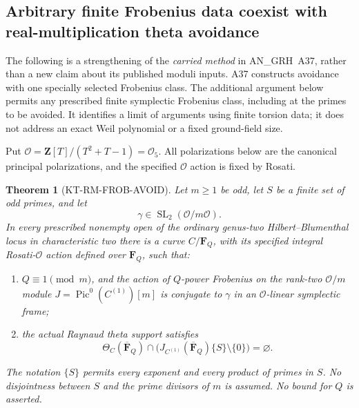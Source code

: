 \documentclass[11pt,a4paper]{article}
\newtheorem{theorem}{Theorem}[section]
\theoremstyle{definition}
\begin{document}


\subsection{Arbitrary finite Frobenius data coexist with real-multiplication theta avoidance}
\label{sec:kt-rm-frobenius-avoidance}

The following is a strengthening of the \emph{carried method} in
AN\_GRH~A37, rather than a new claim about its published moduli
inputs.  A37 constructs avoidance with one specially selected
Frobenius class.  The additional argument below permits any
prescribed finite symplectic Frobenius class, including at the
primes to be avoided.  It identifies a limit of arguments using
finite torsion data; it does not address an exact Weil polynomial
or a fixed ground-field size.

Put $\mathcal O=\mathbf Z[T]/(T^2+T-1)=\mathcal O_5$.
All polarizations below are the canonical principal polarizations,
and the specified $\mathcal O$ action is fixed by Rosati.

\begin{theorem}[KT-RM-FROB-AVOID]
Let $m\geq1$ be odd, let $S$ be a finite set of odd primes, and
let
\[
                    \gamma\in\operatorname{SL}_2(\mathcal O/m\mathcal O).
                                                               \tag{RF.1}
\]
In every prescribed nonempty open of the ordinary genus-two
Hilbert--Blumenthal locus in characteristic two there is a curve
$C/\mathbf F_Q$,
with its specified integral Rosati-$\mathcal O$ action defined
over $\mathbf F_Q$, such that:
\begin{enumerate}
\item $Q\equiv1\pmod m$, and the action of $Q$-power Frobenius
      on the rank-two $\mathcal O/m$ module
      $J=\operatorname{Pic}^0(C^{(1)})[m]$ is conjugate to $\gamma$
      in an $\mathcal O$-linear symplectic frame;
\item the actual Raynaud theta support satisfies
\[
 \Theta_C(\overline{\mathbf F}_Q)\cap
 \bigl(J_{C^{(1)}}(\overline{\mathbf F}_Q)\{S\}\setminus\{0\}\bigr)
                          =\varnothing.                       \tag{RF.2}
\]
\end{enumerate}
The notation $\{S\}$ permits every exponent and every product
of primes in $S$.  No disjointness between $S$ and the prime
divisors of $m$ is assumed.  No bound for $Q$ is asserted.
\end{theorem}
\end{document}
